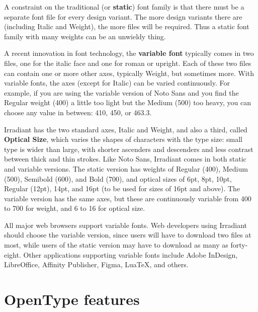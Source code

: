 \documentclass[12pt]{book}
\begin{document}
A constraint on the traditional (or \textbf{static}) font family is that there must be a separate
font file for every design variant. The more design variants there are
(including Italic and Weight), the more files will be required. Thus a static font family with many 
weights can be an unwieldy thing.

A recent innovation in font technology, the \textbf{variable font} typically comes in two files,
one for the italic face and one for roman or upright. Each of these two files can contain 
one or more other axes, typically Weight, but sometimes more. With variable fonts,
the axes (except for Italic) can be varied continuously. For example, if you are using the
variable version of Noto Sans and you find the Regular weight (400) a little too light but the 
Medium (500) too heavy, you can choose any value in between: 410, 450, or 463.3.

Irradiant has the two standard axes, Italic and Weight, and also a third, called \textbf{Optical Size},
which varies the shapes of characters with the type size: small type is wider than 
large, with shorter ascenders and descenders and less contrast between thick and thin strokes.
Like Noto Sans, Irradiant comes in both static and variable versions. The static version has
weights of Regular (400), Medium (500), Semibold (600), and Bold (700), and optical sizes of
6pt, 8pt, 10pt, Regular (12pt), 14pt, and 16pt (to be used for sizes of 16pt and above).
The variable version has the same axes, but these are continuously variable from 400 to 700 for
weight, and 6 to 16 for optical size.

All major web browsers support variable fonts. Web developers using Irradiant should choose the
variable version, since users will have to download two files at most, while users of the static
version may have to download as many as forty-eight. Other applications supporting variable 
fonts include Adobe InDesign, LibreOffice, Affinity Publisher, Figma, LuaTeX, and others.%
\pagebreak




\section*{OpenType features}
\end{document}

